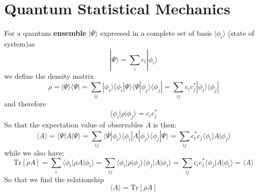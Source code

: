 \documentclass{article}
\begin{document}
\pagebreak
\section{Quantum Statistical Mechanics}
For a quantum \textbf{ensemble} $|\Psi\rangle$ expressed in a complete set of basis $|\phi_i\rangle$ (state of system)as 
\begin{equation}
    |\Psi\rangle = \sum_i c_i |\phi_i\rangle
\end{equation}
we define the density matrix 
\begin{equation}
    \rho = |\Psi\rangle \langle \Psi | = \sum_{ij} |\phi_i\rangle \langle \phi_i| \Psi\rangle \langle \Psi |\phi_j\rangle \langle \phi_j|
    = \sum_{ij} c_i c_j^* |\phi_i\rangle \langle \phi_j| \label{density1}
\end{equation}
and therefore
\begin{equation}
    \langle \phi_i | \rho | \phi_j \rangle = c_i c_j^*
\end{equation}
So that the expectation value of observables $A$ is then:
\begin{equation}
    \langle A \rangle = \langle \Psi | A | \Psi \rangle
    = \sum_{ij} \langle \Psi |\phi_i\rangle \langle \phi_i| A | \phi_j\rangle \langle \phi_j|\Psi \rangle
    = \sum_{ij} c_i^* c_j \langle \phi_i| A | \phi_j\rangle
\end{equation}
while we also have:
\begin{equation}
    \text{Tr}[\rho A] = \sum_i \langle \phi_i | \rho A | \phi_i \rangle
        = \sum_{ij} \langle \phi_i | \rho | \phi_j \rangle \langle \phi_j | A | \phi_i \rangle
        = \sum_{ij} c_i c_j^* \langle \phi_j | A | \phi_i \rangle = \langle A \rangle
\end{equation}
So that we find the relationship
\begin{equation}
    \langle A \rangle = \text{Tr}[\rho A]
\end{equation}
\end{document}
